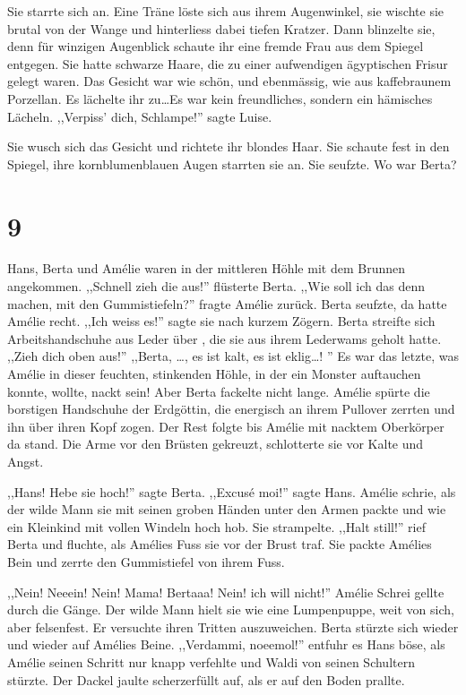 \documentclass[11pt,titlepage,a5paper]{book}
\newcommand{\am}{Amélie }
\begin{document}
Sie starrte sich an. Eine Träne löste sich aus ihrem Augenwinkel, sie wischte sie brutal von der Wange und hinterliess dabei tiefen Kratzer. Dann blinzelte sie, denn für winzigen Augenblick schaute ihr eine fremde Frau aus dem Spiegel entgegen. Sie hatte schwarze Haare, die zu einer aufwendigen ägyptischen Frisur gelegt waren. Das Gesicht war wie schön, und ebenmässig, wie aus kaffebraunem Porzellan. Es lächelte ihr zu\dots Es war kein freundliches, sondern ein hämisches Lächeln. ,,Verpiss' dich, Schlampe!'' sagte Luise. 

Sie wusch sich das Gesicht und richtete ihr blondes Haar. Sie schaute fest in den Spiegel, ihre kornblumenblauen Augen starrten sie an. Sie seufzte. Wo war Berta? 

\section*{9}

Hans, Berta und \am waren in der mittleren Höhle mit dem Brunnen angekommen. ,,Schnell zieh die aus!'' flüsterte Berta. ,,Wie soll ich das denn machen, mit den Gummistiefeln?'' fragte \am zurück. Berta seufzte, da hatte \am recht. ,,Ich weiss es!'' sagte sie nach kurzem Zögern. Berta streifte sich Arbeitshandschuhe aus Leder über , die sie aus ihrem Lederwams geholt hatte. ,,Zieh dich oben aus!'' ,,Berta, \dots, es ist kalt, es ist eklig\dots! '' Es war das letzte, was \am in dieser feuchten, stinkenden Höhle, in der ein Monster auftauchen konnte, wollte, nackt sein! Aber Berta fackelte nicht lange. \am spürte die borstigen Handschuhe der Erdgöttin, die energisch an ihrem Pullover zerrten und ihn über ihren Kopf zogen. Der Rest folgte bis \am mit nacktem Oberkörper da stand. Die Arme vor den Brüsten gekreuzt, schlotterte sie vor Kalte und Angst.

,,Hans! Hebe sie hoch!'' sagte Berta. ,,Excusé moi!'' sagte Hans. Amélie schrie, als der wilde Mann sie mit seinen groben Händen unter den Armen packte und wie ein Kleinkind mit vollen Windeln  hoch hob. Sie strampelte. ,,Halt still!'' rief Berta und fluchte, als Amélies Fuss sie vor der Brust traf. Sie packte Amélies Bein und zerrte den Gummistiefel von ihrem Fuss.

,,Nein! Neeein! Nein! Mama! Bertaaa! Nein! ich will nicht!'' \am Schrei gellte durch die Gänge. Der wilde Mann hielt sie wie eine Lumpenpuppe, weit von sich, aber felsenfest. Er versuchte ihren Tritten auszuweichen. Berta stürzte sich wieder und wieder auf Amélies Beine. ,,Verdammi, noeemol!'' entfuhr es Hans böse, als \am seinen Schritt nur knapp verfehlte und Waldi von seinen Schultern stürzte. Der Dackel jaulte scherzerfüllt auf, als er auf den Boden prallte.
\end{document}
